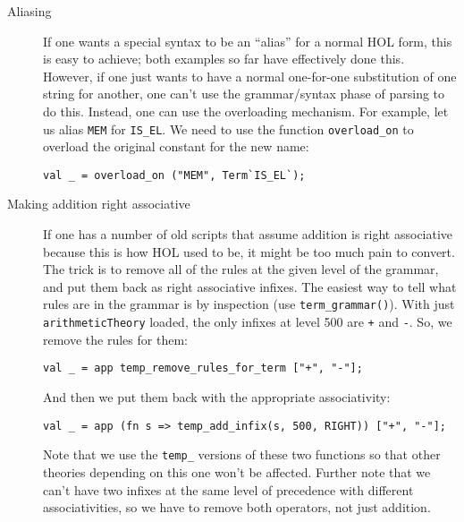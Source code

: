 {\begin{description}
\item[Aliasing] If one wants a special syntax to be an ``alias'' for a
  normal HOL form, this is easy to achieve; both examples so far have
  effectively done this.  However, if one just wants to have a normal
  one-for-one substitution of one string for another, one can't use
  the grammar/syntax phase of parsing to do this.  Instead, one can
  use the overloading mechanism.  For example, let us alias
  \texttt{MEM} for \texttt{IS\_EL}.  We need to use the function
  \texttt{overload\_on} to overload the original constant for the new
  name:
  \begin{verbatim}
val _ = overload_on ("MEM", Term`IS_EL`);
\end{verbatim}

\item[Making addition right associative] If one has a number of old
  scripts that assume addition is right associative because this is
  how HOL used to be, it might be too much pain to convert.  The trick
  is to remove all of the rules at the given level of the grammar, and
  put them back as right associative infixes.  The easiest way to tell
  what rules are in the grammar is by inspection (use
  \texttt{term\_grammar()}).  With just \texttt{arithmeticTheory}
  loaded, the only infixes at level 500 are \texttt{+} and
  \texttt{-}.  So, we remove the rules for them:
  \begin{verbatim}
val _ = app temp_remove_rules_for_term ["+", "-"];
\end{verbatim}
  \noindent And then we put them back with the appropriate
  associativity:
\begin{verbatim}
val _ = app (fn s => temp_add_infix(s, 500, RIGHT)) ["+", "-"];
\end{verbatim}
\noindent Note that we use the \texttt{temp\_} versions of these two
functions so that other theories depending on this one won't be
affected.  Further note that we can't have two infixes at the same
level of precedence with different associativities, so we have to
remove both operators, not just addition.

\end{description}

}

